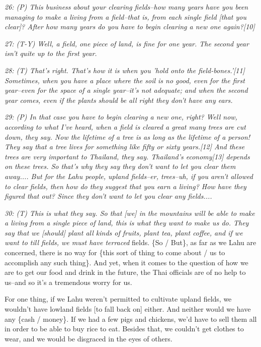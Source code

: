 \textit{26: (P) This business about your clearing fields--how many years have you
been managing to make a living from a field--that is, from each single field [that
you clear]? After how many years do you have to begin clearing a new one again?[10]}

\textit{27: (T-Y) Well, a field, one piece of land, is fine for one year. The second
year isn't quite up to the first year. }

\textit{28: (T) That's right. That's how it is when you 'hold onto the field-bones.'[11]
Sometimes, when you have a place where the soil is no good, even for the first
year--even for the space of a single year--it's not adequate; and when the second
year comes, even if the plants should be all right they don't have any ears. }

\textit{29: (P) In that case you have to begin clearing a new one, right? Well
now, according to what I've heard, when a field is cleared a great many trees are
cut down, they say. Now the lifetime of a tree is as long as the lifetime of a
person! They say that a tree lives for something like fifty or sixty years.[12]
And these trees are very important to Thailand, they say. Thailand's economy[13]
depends on these trees. So that's why they say they don't want to let you clear
them away.... But for the Lahu people, upland fields--er, trees--uh, if you aren't
allowed to clear fields, then how do they suggest that you earn a living? How have
they figured that out? Since they don't want to let you clear any fields.... }

\textit{30: (T) This is what they say. So that [we] in the mountains will be able
to make a living from a single piece of land, this is what they want to make us
do. They say that we [should] plant all kinds of fruits, plant tea, plant coffee,
and if we want to till fields, we must have terraced} fields. \{So / But\}, as
far as we Lahu are concerned, there is no way for \{this sort of thing to come
about / us to accomplish any such thing\}. And yet, when it comes to the question
of how we are to get our food and drink in the future, the Thai officials are of
no help to us--and so it's a tremendous worry for us.

For one thing, if we Lahu weren't permitted to cultivate upland fields, we wouldn't
have lowland fields [to fall back on] either. And neither would we have any \{cash
/ money\}. If we had a few pigs and chickens, we'd have to sell them all in order
to be able to buy rice to eat. Besides that, we couldn't get clothes to wear, and
we would be disgraced in the eyes of others.

